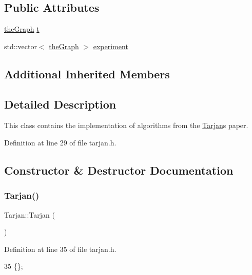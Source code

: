 \subsection*{Public Attributes}
\begin{DoxyCompactItemize}
\item 
\hyperlink{class_graph_component_a982e0748a6e1b8dc74986f5f8b3dca5c}{the\+Graph} \hyperlink{class_tarjan_a54b0703f885a3514ea0bf4cdbc7fdaad}{t}
\item 
std\+::vector$<$ \hyperlink{class_graph_component_a982e0748a6e1b8dc74986f5f8b3dca5c}{the\+Graph} $>$ \hyperlink{class_tarjan_aaa327f105a07f07648dcc6f62a565986}{experiment}
\end{DoxyCompactItemize}
\subsection*{Additional Inherited Members}


\subsection{Detailed Description}
This class contains the implementation of algorithms from the \hyperlink{class_tarjan}{Tarjan}\textquotesingle{}s paper. 

Definition at line 29 of file tarjan.\+h.



\subsection{Constructor \& Destructor Documentation}
\mbox{\label{class_tarjan_a24a7fa59ed2fcff4a520e012e30acb91}} 
\subsubsection{\texorpdfstring{Tarjan()}{Tarjan()}\hspace{0.1cm}{\footnotesize\ttfamily [1/2]}}
{\footnotesize\ttfamily Tarjan\+::\+Tarjan (\begin{DoxyParamCaption}{ }\end{DoxyParamCaption})\hspace{0.3cm}{\ttfamily [inline]}}



Definition at line 35 of file tarjan.\+h.


\begin{DoxyCode}
35 \{\};
\end{DoxyCode}
\mbox{\label{class_tarjan_a7e9845c51e1e905df76b267370c6dc00}} 
